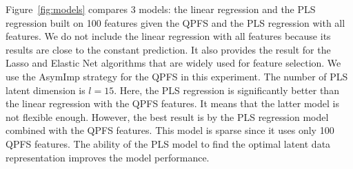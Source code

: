 \documentclass[preprint,authoryear,12pt]{elsarticle}
\theoremstyle{definition}
\begin{document}
Figure~\ref{fig:models} compares 3 models: the linear regression and the PLS regression built on 100 features given the QPFS and the PLS regression with all features.
We do not include the linear regression with all features because its results are close to the constant prediction. It also provides the result for the Lasso and Elastic Net algorithms that are widely used for feature selection.
We use the AsymImp strategy for the QPFS in this experiment.
The number of PLS latent dimension is $l = 15$.
Here, the PLS regression is significantly better than the linear regression with the QPFS features.
It means that the latter model is not flexible enough.
However, the best result is by the PLS regression model combined with the QPFS features. 
This model is sparse since it uses only 100 QPFS features.
The ability of the PLS model to find the optimal latent data representation improves the model performance. 
\end{document}
